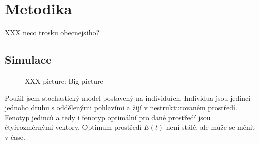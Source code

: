 \chapter{Metodika}



XXX neco trosku obecnejsiho?

\section{Simulace}

\begin{figure}[!b]
    \centering


    \caption{XXX picture: Big picture}
\end{figure}

Použil jsem stochastický model postavený na individuích. Individua jsou jedinci jednoho druhu s oddělenými pohlavími a
žijí v nestrukturovaném prostředí. Fenotyp jedinců a tedy i fenotyp optimální pro dané prostředí jsou čtyřrozměrnými
vektory. Optimum prostředí $E(t)$ není stálé, ale může se měnit v čase.

